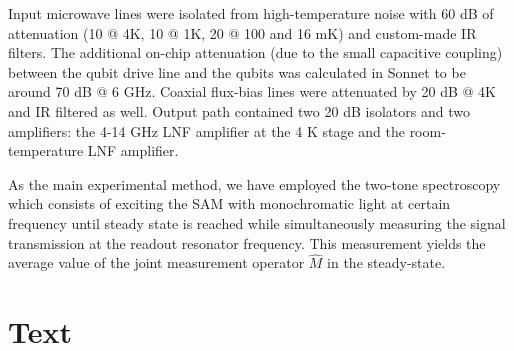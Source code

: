 \documentclass[%
 aip,
 amsmath,amssymb,
 reprint,%
]{revtex4-1}
\begin{document}
Input microwave lines were isolated from high-temperature noise with 60 dB of attenuation (10 @ 4K, 10 @ 1K, 20 @ 100 and 16 mK) and custom-made IR filters. The additional on-chip attenuation (due to the small capacitive coupling) between the qubit drive line and the qubits was calculated in Sonnet to be around 70 dB @ 6 GHz. Coaxial flux-bias lines were attenuated by 20 dB @ 4K and IR filtered as well. Output path contained two 20 dB isolators and two amplifiers: the 4-14 GHz LNF amplifier at the 4 K stage and the room-temperature LNF amplifier.

As the main experimental method, we have employed the two-tone spectroscopy which consists of exciting the SAM with monochromatic light at certain frequency until steady state is reached while simultaneously measuring the signal transmission at the readout resonator frequency. This measurement yields the average value of the joint measurement operator $\hat M$ in the steady-state.

\section{Text}
\end{document}
